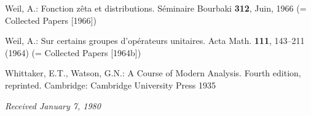 \documentclass[12pt,a4paper]{article}
\theoremstyle{plain}
\theoremstyle{definition}
\theoremstyle{remark}
\begin{document}
\begin{enumerate}[label={[\arabic*]}, leftmargin=*, itemsep=0.5ex]
\item Weil, A.: Fonction z\^{e}ta et distributions. S\'{e}minaire Bourbaki \textbf{312}, Juin, 1966 (= Collected Papers [1966])

\item Weil, A.: Sur certains groupes d'op\'{e}rateurs unitaires. Acta Math. \textbf{111}, 143--211 (1964) (= Collected Papers [1964b])

\item Whittaker, E.T., Watson, G.N.: A Course of Modern Analysis. Fourth edition, reprinted. Cambridge: Cambridge University Press 1935
\end{enumerate}

\vspace{2ex}
\noindent\textit{Received January 7, 1980}
\end{document}
